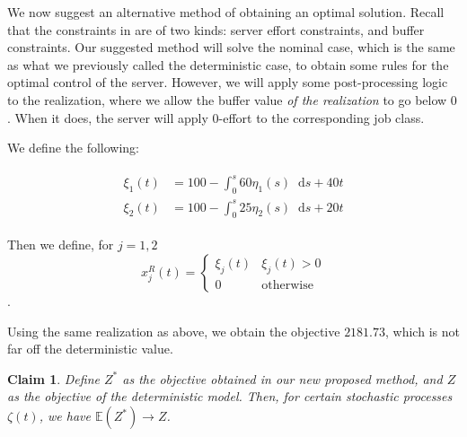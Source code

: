 \documentclass[11pt,a4paper,titlepage]{article}
\newcommand*{\dd}{\ensuremath{\mathop{}\!\mathrm{d}}}%
\theoremstyle{definition}
\theoremstyle{plain}
\newtheorem{claim}{Claim}
\begin{document}
We now suggest an alternative method of obtaining an optimal solution.
Recall that the constraints in 
are of two kinds:
server effort constraints,
and buffer constraints.
Our suggested method will solve the nominal case,
which is the same as what we previously called the deterministic case,
to obtain some rules for the optimal control of the server.
However,
we will apply some post-processing logic to the realization,
where we allow the buffer value \textit{of the realization}
to go below $0$.
When it does,
the server will apply $0$-effort to the corresponding job class.

We define the following:

\begin{align}
\begin{split}
    \xi_1(t) & = 100 - \int_0^s 60 \eta_1(s) \dd s  + 40t \\
    \xi_2(t) & = 100 - \int_0^s 25 \eta_2(s) \dd s  + 20t
\end{split}
\end{align}

Then we define, for $j=1,2$
\begin{equation}
    x_j^R(t) =
    \begin{cases}
        \xi_j(t) & \xi_j(t) > 0 \\
        0 & \text{otherwise}
    \end{cases}
\end{equation}.

Using the same realization as above,
we obtain the objective $2181.73$,
which is not far off the deterministic value.

\begin{claim}
    Define $Z^*$ as the objective obtained in our new proposed method,
    and $Z$ as the objective of the deterministic model.
    Then,
    for certain stochastic processes $\zeta(t)$,
    we have $\mathbb{E}(Z^*) \to Z$.
\end{claim}


\clearpage
\printbibliography
\label{sec:bibliography}
\end{document}

